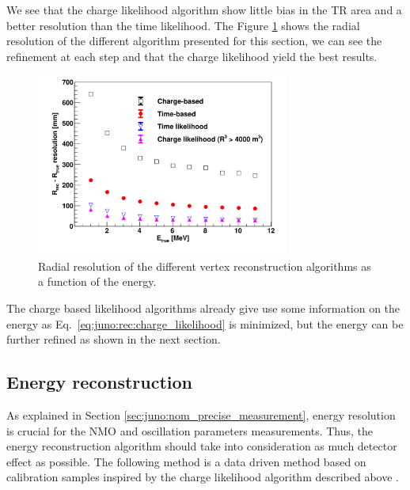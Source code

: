 \documentclass[../main.tex]{subfiles}
\begin{document}
We see that the charge likelihood algorithm show little bias in the TR area and a better resolution than the time likelihood. The Figure \ref{fig:juno:rec:all_class} shows the radial resolution of the different algorithm presented for this section, we can see the refinement at each step and that the charge likelihood yield the best results.

\begin{figure}[ht]
  \centering
  \includegraphics[height=6cm]{images/juno/reco/vertex_reco_classique.png}
  \caption{Radial resolution of the different vertex reconstruction algorithms as a function of the energy.}
  \label{fig:juno:rec:all_class}
\end{figure}

The charge based likelihood algorithms already give use some information on the energy as Eq.\ \ref{eq:juno:rec:charge_likelihood} is minimized, but the energy can be further refined as shown in the next section.


\subsection{Energy reconstruction}

As explained in Section \ref{sec:juno:nom_precise_measurement}, energy resolution is crucial for the NMO and oscillation parameters measurements. Thus, the energy reconstruction algorithm should take into consideration as much detector effect as possible. The following method is a data driven method based on calibration samples inspired by the charge likelihood algorithm described above \cite{huang_data-driven_2023}.
\end{document}
